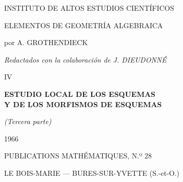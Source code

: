\begin{titlepage}
\thispagestyle{empty}
\begin{center}
{\Large INSTITUTO DE ALTOS ESTUDIOS CIENTÍFICOS\par}
\vspace{4.5em}
{\LARGE ELEMENTOS DE GEOMETRÍA ALGEBRAICA\par}
\vspace{1.5em}
{\large por A. GROTHENDIECK\par}
\vspace{0.5em}
{\large\itshape Redactados con la colaboración de J. DIEUDONNÉ\par}
\vspace{3em}
{\Large IV\par}
\vspace{1.25em}
{\Large\bfseries ESTUDIO LOCAL DE LOS ESQUEMAS\\
Y DE LOS MORFISMOS DE ESQUEMAS\par}
\vspace{0.75em}
{\large\itshape (Tercera parte)\par}
\vfill
{\Large 1966\par}
\vspace{1.5em}
{\Large PUBLICATIONS MATHÉMATIQUES, N.º 28\par}
\vspace{0.75em}
{\large LE BOIS-MARIE --- BURES-SUR-YVETTE (S.-et-O.)\par}
\end{center}
\end{titlepage}

\clearpage
\thispagestyle{empty}
\vspace*{0.27\textheight}
\begin{center}
\end{center}

\vfill

\clearpage
